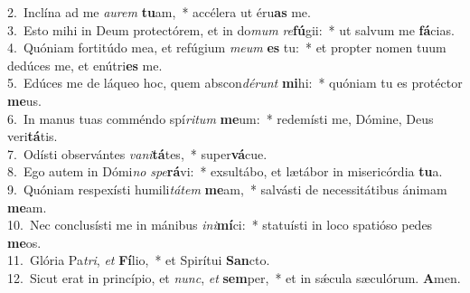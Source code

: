 {2.~}Inclína ad me \textit{au}\textit{rem} \textbf{tu}am,~* accélera ut éru\textbf{as} me.\\
{3.~}Esto mihi in Deum protectórem, et in do\textit{mum} \textit{re}\textbf{fú}gii:~* ut salvum me \textbf{fá}cias.\\
{4.~}Quóniam fortitúdo mea, et refúgium \textit{me}\textit{um} \textbf{es} tu:~* et propter nomen tuum dedúces me, et enútri\textbf{es} me.\\
{5.~}Edúces me de láqueo hoc, quem abscon\textit{dé}\textit{runt} \textbf{mi}hi:~* quóniam tu es protéctor \textbf{me}us.\\
{6.~}In manus tuas comméndo spí\textit{ri}\textit{tum} \textbf{me}um:~* redemísti me, Dómine, Deus veri\textbf{tá}tis.\\
{7.~}Odísti observántes \textit{va}\textit{ni}\textbf{tá}tes,~* super\textbf{vá}cue.\\
{8.~}Ego autem in Dómi\textit{no} \textit{spe}\textbf{rá}vi:~* exsultábo, et lætábor in misericórdia \textbf{tu}a.\\
{9.~}Quóniam respexísti humili\textit{tá}\textit{tem} \textbf{me}am,~* salvásti de necessitátibus ánimam \textbf{me}am.\\
{10.~}Nec conclusísti me in mánibus \textit{i}\textit{ni}\textbf{mí}ci:~* statuísti in loco spatióso pedes \textbf{me}os.\\
{11.~}Glória Pa\textit{tri}, \textit{et} \textbf{Fí}lio,~* et Spirítui \textbf{San}cto.\\
{12.~}Sicut erat in princípio, et \textit{nunc}, \textit{et} \textbf{sem}per,~* et in sǽcula sæculórum. \textbf{A}men.\\

